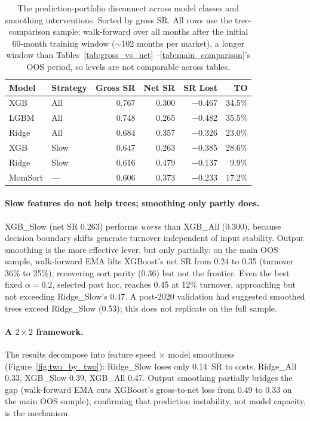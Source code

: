 \documentclass[sigconf,review,anonymous,balance=false]{acmart}
\begin{document}
\begin{table}[t]
\centering
\caption{The prediction-portfolio disconnect across model classes and
smoothing interventions. Sorted by gross SR. All rows use the
tree-comparison sample: walk-forward over all
months after the initial 60-month training window (${\sim}$102 months
per market), a longer window than Tables~\ref{tab:gross_vs_net}%
--\ref{tab:main_comparison}'s OOS period, so levels are not comparable
across tables.}
\label{tab:tree_inversion}
\small
\begin{tabular}{@{}llrrrr@{}}
\toprule
Model & Strategy & Gross SR & Net SR & SR Lost & TO \\
\midrule
XGB   & All          & 0.767 & 0.300 & $-$0.467 & 34.5\% \\
LGBM  & All          & 0.748 & 0.265 & $-$0.482 & 35.5\% \\
Ridge & All          & 0.684 & 0.357 & $-$0.326 & 23.0\% \\
XGB   & Slow         & 0.647 & 0.263 & $-$0.385 & 28.6\% \\
Ridge & Slow         & 0.616 & 0.479 & $-$0.137 & 9.9\% \\
MomSort & ---        & 0.606 & 0.373 & $-$0.233 & 17.2\% \\
\bottomrule
\end{tabular}
\end{table}

\paragraph{Slow features do not help trees; smoothing only partly
does.}
XGB\_Slow (net SR 0.263) performs \emph{worse} than XGB\_All (0.300),
because decision boundary shifts generate turnover independent of
input stability. Output smoothing is the more effective lever, but
only partially: on the main OOS sample, walk-forward EMA lifts
XGBoost's net SR from 0.24 to 0.35 (turnover 36\% to 25\%),
recovering sort parity (0.36) but not the frontier. Even the best
fixed $\alpha = 0.2$, selected post hoc, reaches 0.45 at 12\%
turnover, approaching but not exceeding Ridge\_Slow's 0.47. A
post-2020 validation had suggested smoothed trees exceed
Ridge\_Slow (0.53); this does not replicate on the full sample.

\paragraph{A $2 \times 2$ framework.}
The results decompose into feature speed $\times$ model smoothness
(Figure~\ref{fig:two_by_two}): Ridge\_Slow loses only 0.14~SR to
costs, Ridge\_All 0.33, XGB\_Slow 0.39, XGB\_All 0.47. Output
smoothing partially bridges the gap (walk-forward EMA cuts
XGBoost's gross-to-net loss from 0.49 to 0.33 on the main OOS
sample),
confirming that prediction instability, not model capacity, is
the mechanism.
\end{document}
